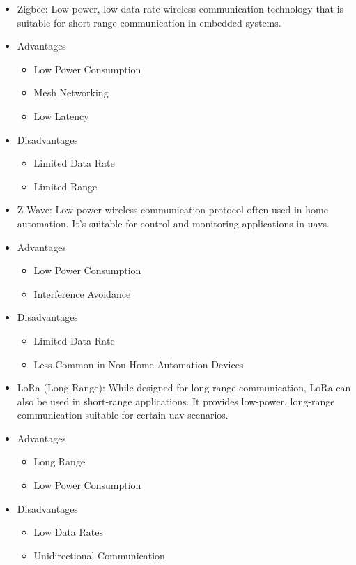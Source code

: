 \begin{itemize}
    \item Zigbee: Low-power, low-data-rate wireless communication technology that is suitable for short-range communication in embedded systems.
    \item Advantages
          \begin{itemize}
              \item Low Power Consumption
              \item Mesh Networking
              \item Low Latency
          \end{itemize}
    \item Disadvantages
          \begin{itemize}
              \item Limited Data Rate
              \item Limited Range
          \end{itemize}

    \item Z-Wave: Low-power wireless communication protocol often used in home automation. It's suitable for control and monitoring applications in \glspl{uav}.
    \item Advantages
          \begin{itemize}
              \item Low Power Consumption
              \item Interference Avoidance
          \end{itemize}
    \item Disadvantages
          \begin{itemize}
              \item Limited Data Rate
              \item Less Common in Non-Home Automation Devices
          \end{itemize}

    \item LoRa (Long Range): While designed for long-range communication, LoRa can also be used in short-range applications. It provides low-power, long-range communication suitable for certain \gls{uav} scenarios.
    \item Advantages
          \begin{itemize}
              \item Long Range
              \item Low Power Consumption
          \end{itemize}
    \item Disadvantages
          \begin{itemize}
              \item Low Data Rates
              \item Unidirectional Communication
          \end{itemize}
\end{itemize}

